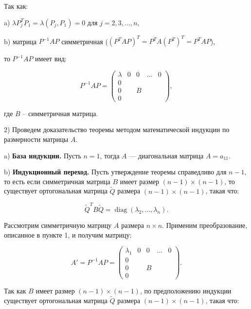 {Так как:

a) \( \lambda P_j^T P_1 = \lambda (P_j, P_1) = 0 \) для \( j = 2, 3, \dots, n \),

b) матрица \( P^{-1} A P \) симметричная (\( (P^T A P)^T = P^T A (P^T)^T = P^T A P \)),

то \( P^{-1} A P \) имеет вид:



\[
P^{-1} A P =
\begin{pmatrix}
\lambda & 0 & 0 & \dots & 0 \\
0 &  &  &  &  \\
0 &  & B &  &  \\
0 &  &  &  &
\end{pmatrix},
\]



где \( B \) – симметричная матрица.

2) Проведем доказательство теоремы методом математической индукции по размерности матрицы \( A \).

a) \textbf{База индукции.} Пусть \( n = 1 \), тогда \( A \) — диагональная матрица \( A = a_{11} \).

b) \textbf{Индукционный переход.} Пусть утверждение теоремы справедливо для \( n - 1 \), то есть если симметричная матрица \( B \) имеет размер \( (n - 1) \times (n - 1) \), то существует ортогональная матрица \( \tilde{Q} \) размера \( (n - 1) \times (n - 1) \), такая что:



\[
\tilde{Q}^{T} B \tilde{Q} = \operatorname{diag}(\lambda_2, \dots, \lambda_n).
\]



Рассмотрим симметричную матрицу \( A \) размера \( n \times n \). Применим преобразование, описанное в пункте 1, и получим матрицу:



\[
A' = P^{-1} A P =
\begin{pmatrix}
\lambda_1 & 0 & 0 & \dots & 0 \\
0 &  &  &  &  \\
0 &  & B &  &  \\
0 &  &  &  &
\end{pmatrix}.
\]



Так как \( B \) имеет размер \( (n - 1) \times (n - 1) \), по предположению индукции существует ортогональная матрица \( \tilde{Q} \) размера \( (n - 1) \times (n - 1) \), такая что:



}
